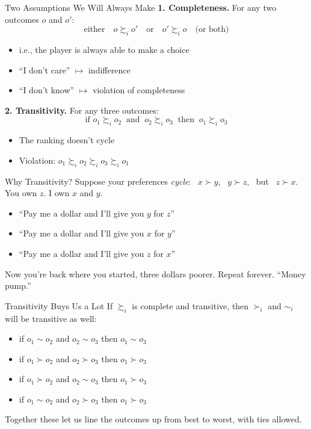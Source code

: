 \begin{frame}{Two Assumptions We Will Always Make}
\textbf{1. Completeness.} For any two outcomes $o$ and $o'$:
$$\text{either}\quad o\succsim_i o' \quad\text{or}\quad o'\succsim_i o \quad\text{(or both)}$$
\begin{itemize}
    \item i.e., the player is always able to make a choice
    \item ``I don't care'' $\mapsto$ indifference
    \item ``I don't know'' $\mapsto$ violation of completeness 
    \vspace{0.2in}
\end{itemize}
\bsk
\textbf{2. Transitivity.} For any three outcomes:
$$\text{if } o_1\succsim_i o_2 \ \text{ and } \ o_2\succsim_i o_3 \ \text{ then } \ o_1\succsim_i o_3$$
\begin{itemize}
    \item The ranking doesn't cycle
    \item Violation: $o_1 \succsim_i o_2 \succsim_i o_3 \succsim_i o_1$
\end{itemize}
\end{frame}

\begin{frame}{Why Transitivity?}
Suppose your preferences \textit{cycle}: \ $x\succ y$, \ $y\succ z$, \ but \ $z\succ x$.
\bsk
You own $z$. I own $x$ and $y$.
\bsk
\begin{itemize}
    \item ``Pay me a dollar and I'll give you $y$ for $z$'' \vspace{0.35in}
    \item ``Pay me a dollar and I'll give you $x$ for $y$'' \vspace{0.35in}
    \item ``Pay me a dollar and I'll give you $z$ for $x$'' \vspace{0.35in}
\end{itemize}
Now you're back where you started, three dollars poorer. Repeat forever. ``Money pump.''
\end{frame}

\begin{frame}{Transitivity Buys Us a Lot}
If $\succsim_i$ is complete and transitive, then $\succ_i$ and $\sim_i$ will be transitive as well:
\bsk
\begin{itemize}
    \item if $o_1\sim o_2$ and $o_2\sim o_3$ then $o_1\sim o_3$
    \item if $o_1\succ o_2$ and $o_2\succ o_3$ then $o_1\succ o_3$
    \item if $o_1\succ o_2$ and $o_2\sim o_3$ then $o_1\succ o_3$
    \item if $o_1\sim o_2$ and $o_2\succ o_3$ then $o_1\succ o_3$
\end{itemize}
\vfill
Together these let us line the outcomes up from best to worst,
with ties allowed.
\vspace{-0.5in}
\end{frame}

